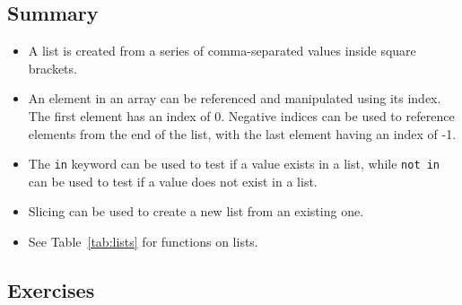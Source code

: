 \documentclass[11pt]{cselabheader}
\begin{document}
\subsection{Summary}

\begin{itemize}
  \item A list is created from a series of comma-separated values inside square
    brackets.  
  \item An element in an array can be referenced and manipulated
    using its index. The first element has an index of 0. Negative indices can
    be used to reference elements from the end of the list, with the last
    element having an index of -1.
  \item The \lstinline{in} keyword can be used to test if a value exists in a
    list, while \lstinline!not in! can be used to test if a value does not exist
    in a list.
  \item Slicing can be used to create a new list from an existing one.
  \item See Table~\ref{tab:lists} for functions on lists.
\end{itemize}

\subsection{Exercises}
\label{subsec:listsex}
\end{document}
